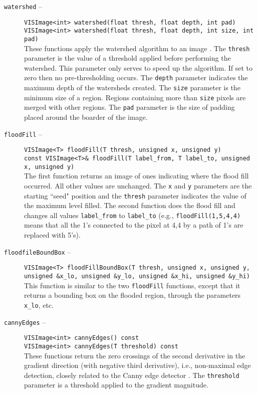 \begin{description}
\item[{\tt watershed} --]
{\tt VISImage<int> watershed(float thresh, float depth, int pad)}\\
{\tt VISImage<int> watershed(float thresh, float depth, int size, int pad)}\\
These functions apply the watershed algorithm to an image \cite{Baccar96}.
The {\tt thresh} parameter is the value of a threshold applied
before performing the watershed.  This parameter only serves to
speed up the algorithm.  If set to zero then no pre-thresholding occurs.
The {\tt depth} parameter indicates the maximum depth of the watersheds
created.  The {\tt size} parameter is the minimum size of a region.
Regions containing more than {\tt size} pixels are merged with other
regions.  The {\tt pad} parameter is the size of padding placed around the
boarder of the image.
\item[{\tt floodFill} --]
{\tt VISImage<T> floodFill(T thresh, unsigned x, unsigned y)}\\
{\tt const VISImage<T>\& floodFill(T label\_from, T label\_to, unsigned x, unsigned y)}\\
The first function returns an image of ones indicating where the flood fill
occurred.  All other values are unchanged.  The {\tt x} and {\tt y} parameters
are the starting ``seed" position and the {\tt thresh} parameter indicates
the value of the maximum level filled.
The second function does the flood fill and changes all values
{\tt label\_from} to {\tt label\_to}
(e.g., {\tt floodFill(1,5,4,4)} means that all the 1's connected to the
pixel at 4,4 by a path of 1's are replaced with 5's).
\item[{\tt floodfileBoundBox} --]
{\tt VISImage<T> floodFillBoundBox(T thresh, unsigned x, unsigned y,}\\
{\tt unsigned \&x\_lo, unsigned \&y\_lo, unsigned \&x\_hi, unsigned \&y\_hi)}\\
This function is similar to the two {\tt floodFill} functions,
except that it returns a bounding box on the flooded region, through the 
parameters {\tt x\_lo}, etc.
\item[{\tt cannyEdges} --]
{\tt VISImage<int> cannyEdges() const}\\
{\tt VISImage<int> cannyEdges(T threshold) const}\\
These functions return the zero crossings of the second derivative in the gradient direction (with negative third derivative), i.e., non-maximal edge 
detection, closely related to the Canny 
edge detector \cite{Canny86}.  
The {\tt threshold} parameter is a threshold 
applied to the gradient magnitude.
\end{description}

